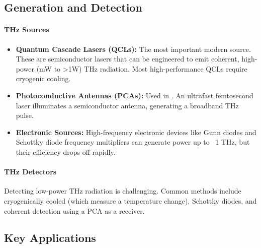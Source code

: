 \subsection{Generation and Detection}

\paragraph{THz Sources}
\begin{itemize}
    \item \textbf{Quantum Cascade Lasers (QCLs):} The most important modern source. These are semiconductor lasers that can be engineered to emit coherent, high-power (mW to >1W) THz radiation. Most high-performance QCLs require cryogenic cooling.
    \item \textbf{Photoconductive Antennas (PCAs):} Used in . An ultrafast femtosecond laser illuminates a semiconductor antenna, generating a broadband THz pulse.
    \item \textbf{Electronic Sources:} High-frequency electronic devices like Gunn diodes and Schottky diode frequency multipliers can generate power up to ~1 THz, but their efficiency drops off rapidly.
\end{itemize}

\paragraph{THz Detectors}
Detecting low-power THz radiation is challenging. Common methods include cryogenically cooled  (which measure a temperature change), Schottky diodes, and coherent detection using a PCA as a receiver.


\subsection{Key Applications}

